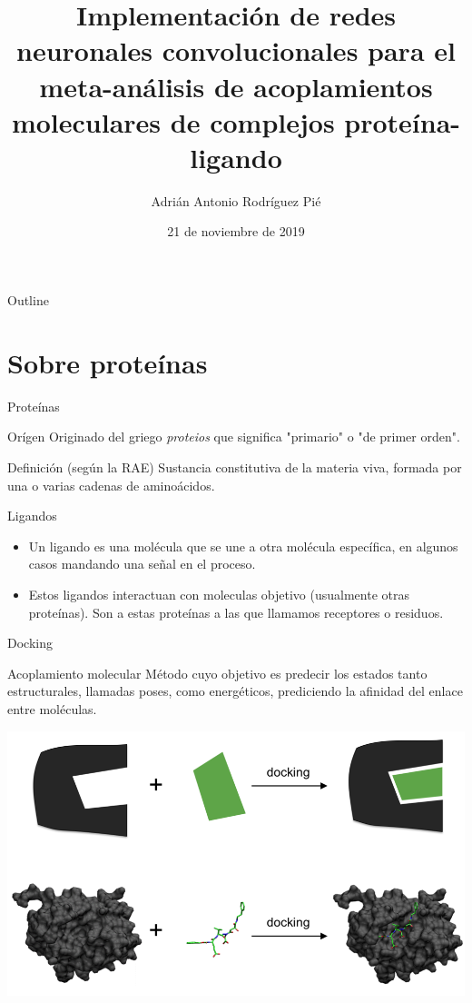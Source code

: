 \documentclass[presentation]{beamer}
\institute{Universidad Nacional Autónoma de México}
\author{Adrián Antonio Rodríguez Pié}
\date{21 de noviembre de 2019}
\title{Implementación de redes neuronales convolucionales para el meta-análisis de acoplamientos moleculares de complejos proteína-ligando}
\begin{document}
\maketitle
\begin{frame}{Outline}
\tableofcontents
\end{frame}



\section{Sobre proteínas}
\label{sec:org9c1b525}
\begin{frame}[label={sec:orgd8c98ff}]{Proteínas}
\begin{block}{Orígen}
Originado del griego \emph{proteios} que significa "primario"
o "de primer orden".
\pause
\end{block}
\begin{block}{Definición (según la \alert{RAE})}
Sustancia constitutiva de la materia viva, formada
por una o varias cadenas de aminoácidos.
\end{block}
\end{frame}
\begin{frame}[label={sec:orgdb416c6}]{Ligandos}
\begin{itemize}
\item Un \alert{ligando} es una molécula que se une a otra molécula específica, en algunos casos mandando una señal en el proceso.
\pause
\item Estos ligandos interactuan con moleculas objetivo (usualmente otras proteínas). Son a estas proteínas a las que llamamos \alert{receptores} o \alert{residuos}.
\end{itemize}
\end{frame}
\begin{frame}[label={sec:orgb6d1281}]{Docking}
\begin{block}{Acoplamiento molecular}
Método cuyo objetivo es predecir los estados tanto estructurales,
llamadas \alert{poses}, como energéticos, prediciendo la afinidad del enlace
entre moléculas.
\begin{center}
\includegraphics[width=.9\linewidth]{images/docking.png}
\end{center}
\end{block}
\end{frame}
\end{document}
